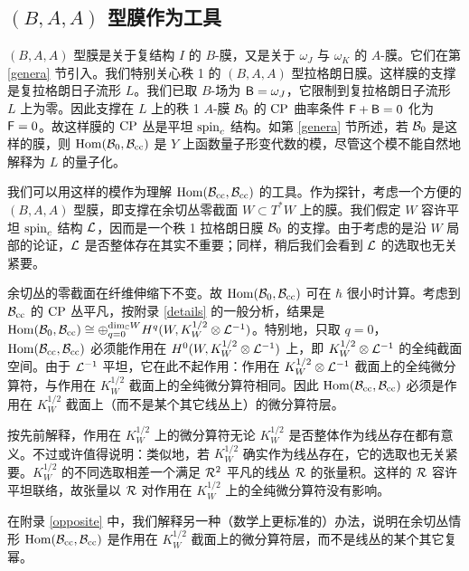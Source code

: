 \subsection{$(B,A,A)$ 型膜作为工具}\label{lagbr}

$(B,A,A)$ 型膜是关于复结构 $I$ 的 $B$-膜，又是关于 $\omega_J$ 与 $\omega_K$ 的 $A$-膜。它们在第 \ref{genera} 节引入。我们特别关心秩 1 的 $(B,A,A)$ 型拉格朗日膜。这样膜的支撑是复拉格朗日子流形 $L$。我们已取 $B$-场为 ${\sf B}=\omega_J$，它限制到复拉格朗日子流形 $L$ 上为零。因此支撑在 $L$ 上的秩 1 $A$-膜 ${\mathcal B}_0$ 的 ${\mathrm{CP}}$ 曲率条件 ${\sf F}+{\sf B}=0$ 化为 ${\sf F}=0$。故这样膜的 ${\mathrm{CP}}$ 丛是平坦 ${\mathrm{spin}_c}$ 结构。如第 \ref{genera} 节所述，若 ${\mathcal B}_0$ 是这样的膜，则 ${\mathrm{Hom}}({\mathcal B}_0,{\mathcal B}_{\mathrm{cc}})$ 是 $Y$ 上函数量子形变代数的模，尽管这个模不能自然地解释为 $L$ 的量子化。

我们可以用这样的模作为理解 ${\mathrm{Hom}}({\mathcal B}_{\mathrm{cc}},{\mathcal B}_{\mathrm{cc}})$ 的工具。作为探针，考虑一个方便的 $(B,A,A)$ 型膜，即支撑在余切丛零截面 $W\subset T^*W$ 上的膜。我们假定 $W$ 容许平坦 ${\mathrm{spin}_c}$ 结构 ${\mathcal L}$，因而是一个秩 1 拉格朗日膜 ${\mathcal B}_0$ 的支撑。由于考虑的是沿 $W$ 局部的论证，${\mathcal L}$ 是否整体存在其实不重要；同样，稍后我们会看到 ${\mathcal L}$ 的选取也无关紧要。

余切丛的零截面在纤维伸缩下不变。故 ${\mathrm{Hom}}({\mathcal B}_0,{\mathcal B}_{\mathrm{cc}})$ 可在 $\hbar$ 很小时计算。考虑到 ${\mathcal B}_{\mathrm{cc}}$ 的 ${\mathrm{CP}}$ 丛平凡，按附录 \ref{details} 的一般分析，结果是 ${\mathrm{Hom}}({\mathcal B}_0,{\mathcal B}_{\mathrm{cc}})\cong\oplus_{q=0}^{{\mathrm{dim}}_{\mathbb C} W}H^q(W,K_W^{1/2}\otimes{\mathcal L}^{-1})$。特别地，只取 $q=0$，${\mathrm{Hom}}({\mathcal B}_{\mathrm{cc}},{\mathcal B}_{\mathrm{cc}})$ 必须能作用在 $H^0(W,K_W^{1/2}\otimes{\mathcal L}^{-1})$ 上，即 $K_W^{1/2}\otimes{\mathcal L}^{-1}$ 的全纯截面空间。由于 ${\mathcal L}^{-1}$ 平坦，它在此不起作用：作用在 $K_W^{1/2}\otimes{\mathcal L}^{-1}$ 截面上的全纯微分算符，与作用在 $K_W^{1/2}$ 截面上的全纯微分算符相同。因此 ${\mathrm{Hom}}({\mathcal B}_{\mathrm{cc}},{\mathcal B}_{\mathrm{cc}})$ 必须是作用在 $K_W^{1/2}$ 截面上（而不是某个其它线丛上）的微分算符层。

按先前解释，作用在 $K_W^{1/2}$ 上的微分算符无论 $K_W^{1/2}$ 是否整体作为线丛存在都有意义。不过或许值得说明：类似地，若 $K_W^{1/2}$ 确实作为线丛存在，它的选取也无关紧要。$K_W^{1/2}$ 的不同选取相差一个满足 ${\mathcal R}^2$ 平凡的线丛 ${\mathcal R}$ 的张量积。这样的 ${\mathcal R}$ 容许平坦联络，故张量以 ${\mathcal R}$ 对作用在 $K_W^{1/2}$ 上的全纯微分算符没有影响。

在附录 \ref{opposite} 中，我们解释另一种（数学上更标准的）办法，说明在余切丛情形 ${\mathrm{Hom}}({\mathcal B}_{\mathrm{cc}},{\mathcal B}_{\mathrm{cc}})$ 是作用在 $K_W^{1/2}$ 截面上的微分算符层，而不是线丛的某个其它复幂。
